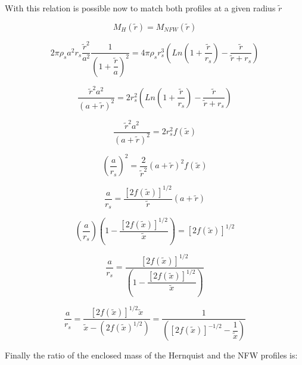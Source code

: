 \documentclass[a4paper, 12pt]{article} %
\begin{document}
With this relation is possible now to match both profiles at a given radius $\tilde{r}$ 

\begin{equation}
M_H(\tilde{r}) = M_{NFW}(\tilde{r}) 
\end{equation}

\begin{equation}
2 \pi \rho_s a^2 r_s \dfrac{\tilde{r}^2}{a^2} \dfrac{1}{\left( 1 + \dfrac{\tilde{r}}{a}\right)^2} = 4 \pi \rho_s r_s^3 \left( Ln \left(1 + \dfrac{\tilde{r}}{r_s} \right)  - \dfrac{\tilde{r}}{\tilde{r} + r_s} \right)
\end{equation}

\begin{equation}
\dfrac{\tilde{r}^2 a^2}{(a + \tilde{r})^2} = 2 r_s^2 \left( Ln \left (1 +  \dfrac{\tilde{r}}{r_s} \right)  - \dfrac{\tilde{r}}{\tilde{r} + r_s}   \right)
\end{equation}


\begin{equation}
\dfrac{\tilde{r}^2 a^2}{(a + \tilde{r})^2} = 2 r_s^2 f(\tilde{x})
\end{equation}

\begin{equation}
\left( \frac{a}{r_s} \right)^2 = \dfrac{2}{\tilde{r}^2} (a + \tilde{r})^2 f(\tilde{x})
\end{equation}




\begin{equation}
\dfrac{a}{r_s} = \dfrac{[2 f(\tilde{x})]^{1/2}}{\tilde{r}} (a + \tilde{r})
\end{equation}

\begin{equation}
\left( \dfrac{a}{r_s} \right) \left( 1 -  \dfrac{[2 f(\tilde{x})]^{1/2}}{\tilde{x}} \right) = [2 f(\tilde{x})]^{1/2} 
\end{equation}

\begin{equation}
\dfrac{a}{r_s} = \dfrac{[2 f(\tilde{x})]^{1/2}}{ \left( 1 -  \dfrac{[2 f(\tilde{x})]^{1/2}}{\tilde{x}} \right)}
\end{equation}

\begin{equation}
\dfrac{a}{r_s} = \dfrac{[2 f(\tilde{x})]^{1/2} \tilde{x}}{\tilde{x} - (2f(\tilde{x})^{1/2})} = \dfrac{1}{\left(  [2 f(\tilde{x})]^{-1/2} - \dfrac{1}{\tilde{x}}  \right)}
\end{equation}

Finally the ratio of the enclosed mass of the Hernquist and the NFW profiles is: 
\end{document}
